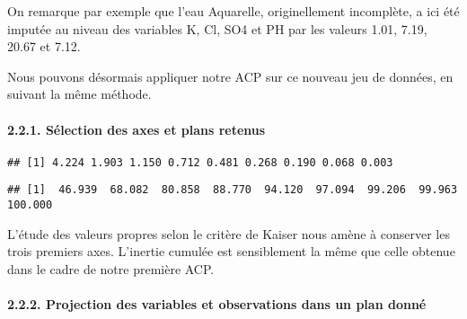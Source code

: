 \documentclass[]{article}
\newenvironment{Shaded}{\begin{snugshade}}{\end{snugshade}}
\newcommand{\KeywordTok}[1]{\textcolor[rgb]{0.13,0.29,0.53}{\textbf{#1}}}
\newcommand{\DecValTok}[1]{\textcolor[rgb]{0.00,0.00,0.81}{#1}}
\newcommand{\OperatorTok}[1]{\textcolor[rgb]{0.81,0.36,0.00}{\textbf{#1}}}
\newcommand{\NormalTok}[1]{#1}
\let\oldparagraph\paragraph
\renewcommand{\paragraph}[1]{\oldparagraph{#1}\mbox{}}
\begin{document}
On remarque par exemple que l'eau Aquarelle, originellement incomplète,
a ici été imputée au niveau des variables K, Cl, SO4 et PH par les
valeurs 1.01, 7.19, 20.67 et 7.12.

Nous pouvons désormais appliquer notre ACP sur ce nouveau jeu de
données, en suivant la même méthode.

\hypertarget{selection-des-axes-et-plans-retenus-1}{\paragraph{2.2.1.
Sélection des axes et plans
retenus}\label{selection-des-axes-et-plans-retenus-1}}

\begin{Shaded}
\end{Shaded}

\begin{verbatim}
## [1] 4.224 1.903 1.150 0.712 0.481 0.268 0.190 0.068 0.003
\end{verbatim}

\begin{Shaded}
\end{Shaded}

\begin{verbatim}
## [1]  46.939  68.082  80.858  88.770  94.120  97.094  99.206  99.963 100.000
\end{verbatim}

L'étude des valeurs propres selon le critère de Kaiser nous amène à
conserver les trois premiers axes. L'inertie cumulée est sensiblement la
même que celle obtenue dans le cadre de notre première ACP.

\hypertarget{projection-des-variables-et-observations-dans-un-plan-donne-1}{\paragraph{2.2.2.
Projection des variables et observations dans un plan
donné}\label{projection-des-variables-et-observations-dans-un-plan-donne-1}}
\end{document}
